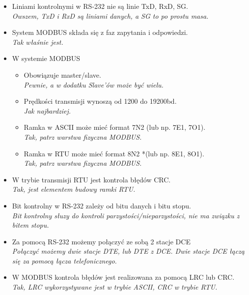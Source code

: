 \documentclass[a4paper,twoside]{article}
\begin{document}
\begin{itemize}
	\item \textcolor{tak}{Liniami kontrolnymi w RS-232 nie są linie TxD, RxD, SG.} \\
	{\small \emph{Owszem, TxD i RxD są liniami danych, a SG to po prostu masa.}}
	
	\item \textcolor{tak}{System MODBUS składa się z faz zapytania i odpowiedzi.} \\
	{\small \emph{Tak właśnie jest.}}
	
	\item {W systemie MODBUS}
	\begin{itemize}
		\item \textcolor{tak}{Obowiązuje master/slave.} \\
		{\small \emph{Pewnie, a w dodatku Slave'ów może być wielu.}}
		
		\item \textcolor{tak}{Prędkości transmisji wynoszą od 1200 do 19200bd.} \\
		{\small \emph{Jak najbardziej.}}
		
		\item \textcolor{tak}{Ramka w ASCII może mieć format 7N2 (lub np. 7E1, 7O1).} \\
		{\small \emph{Tak, patrz warstwa fizyczna MODBUS.}}
		
		\item \textcolor{tak}{Ramka w RTU może mieć format 8N2 *(lub np. 8E1, 8O1).} \\
		{\small \emph{Tak, patrz warstwa fizyczna MODBUS.}}
	\end{itemize} 
	
	
	\item \textcolor{tak}{W trybie transmisji RTU jest kontrola błędów CRC.} \\
	{\small \emph{Tak, jest elementem budowy ramki RTU.}}
	
	\item \textcolor{nie}{Bit kontrolny w RS-232 zależy od bitu danych i bitu stopu.} \\
	{\small \emph{Bit kontrolny słuzy do kontroli parzystości/nieparzystości, nie ma związku z bitem stopu.}}
	
	\item \textcolor{nie}{Za pomocą RS-232 możemy połączyć ze sobą 2 stacje DCE} \\
	{\small \emph{Połączyć możemy dwie stacje DTE, lub DTE z DCE. Dwie stacje DCE łączą się za pomocą łącza telefonicznego.}}
	
	\item \textcolor{tak}{W MODBUS kontrola błędów jest realizowana za pomocą LRC lub CRC.} \\
	{\small \emph{Tak, LRC wykorzystywane jest w trybie ASCII, CRC w trybie RTU.}}
	

\end{itemize}
\end{document}
